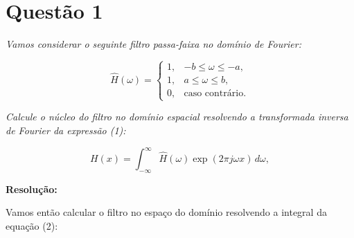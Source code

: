 \documentclass[]{abntex2}
\begin{document}
\frenchspacing 

\maketitle

\section*{\textbf{Questão 1}}

\textit{Vamos considerar o seguinte filtro passa-faixa no domínio de Fourier:}

\begin{equation}
\widehat{H}(\omega) =
\begin{cases}
    1, & -b \leq \omega \leq -a, \\
    1, & a \leq \omega \leq b, \\
    0, & \text{caso contrário.}
\end{cases}
\tag{1}
\end{equation}

\textit{Calcule o núcleo do filtro no domínio espacial resolvendo a transformada inversa de Fourier da expressão (1):}

\begin{equation}
H(x) = \int_{-\infty}^{\infty} \widehat{H}(\omega) \exp(2 \pi j \omega x) \, d\omega,
\tag{2}
\end{equation}

\textbf{Resolução:}

Vamos então calcular o filtro no espaço do domínio resolvendo a integral da equação (2):
\end{document}
